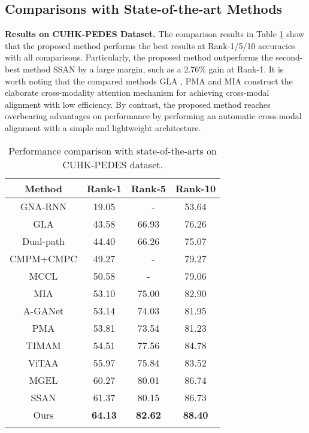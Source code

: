 \documentclass{article}
\begin{document}
\subsection{Comparisons with State-of-the-art Methods}
\textbf{Results on CUHK-PEDES Dataset.}
The comparison results in Table \ref{tab1} show that the proposed method performs the best results at Rank-1/5/10 accuracies with all comparisons. Particularly, the proposed method outperforms the second-best method SSAN \cite{ding2021semantically} by a large margin, such as a 2.76\% gain at Rank-1.
It is worth noting that the compared methods GLA \cite{chen2018improving}, PMA\cite{jing2020pose} and MIA \cite{niu2020improving} construct the elaborate cross-modality attention mechanism for achieving cross-modal alignment with low efficiency. By contrast, the proposed method reaches overbearing advantages on performance by performing an automatic cross-modal alignment with a simple and lightweight architecture.
\begin{table}
\begin{center}
\setlength{\abovecaptionskip}{0.5cm}
\caption{Performance comparison with state-of-the-arts on CUHK-PEDES dataset.}
\label{tab1}
\vspace{-1em}
\begin{tabular}{c|c|c|c}
\Xhline{1.2pt}
Method & Rank-1 & Rank-5 & Rank-10 \\
\hline
GNA-RNN \cite{li2017person} & 19.05 & ~~- & 53.64 \\
GLA \cite{chen2018improving}& 43.58&66.93 &76.26\\
Dual-path \cite{zheng2020dual} & 44.40 & 66.26 & 75.07 \\
CMPM+CMPC \cite{zhang2018deep} & 49.27 & ~~- & 79.27 \\
MCCL \cite{wang2019language} &50.58 &-&79.06\\
MIA \cite{niu2020improving} & 53.10 & 75.00 & 82.90 \\
A-GANet \cite{10.1145/3343031.3350991} & 53.14 &74.03 & 81.95\\
PMA \cite{jing2020pose} & 53.81 & 73.54 & 81.23 \\
TIMAM \cite{zha2020adversarial}& 54.51 & 77.56 & 84.78 \\
ViTAA \cite{wang2020vitaa} & 55.97 & 75.84 &83.52 \\
MGEL \cite{wangtext} & 60.27 & 80.01 & 86.74 \\
SSAN \cite{ding2021semantically} & 61.37 & 80.15 & 86.73 \\
\hline
Ours &\textbf{64.13} & \textbf{82.62} & \textbf{88.40} \\
\Xhline{1.2pt}
\end{tabular}
\end{center}
\vspace{-1em}
\end{table}
\end{document}
